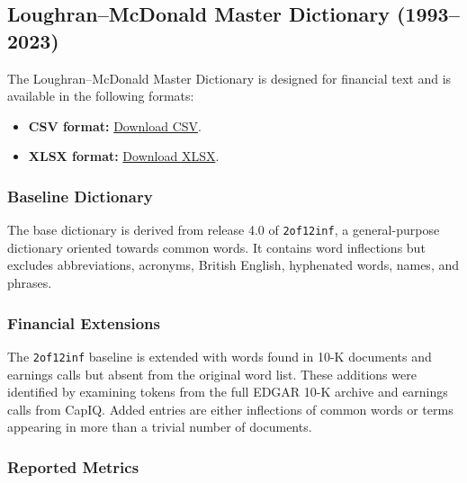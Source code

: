 \documentclass[12pt,openany]{book}
\theoremstyle{definition}
\theoremstyle{remark}
\begin{document}
\subsection{Loughran--McDonald Master Dictionary (1993--2023)}

The Loughran--McDonald Master Dictionary is designed for financial text and
is available in the following formats:

\begin{itemize}





\item \textbf{CSV format:}
\href{https://drive.google.com/file/d/1ptUgGVeeUGhCbaKL14Ri3Xi5xOKkPkUD/view?usp=sharing}{Download CSV}.



\item \textbf{XLSX format:}
\href{https://docs.google.com/spreadsheets/d/1qI1goptbRMlJMKXQFctE4T2wU73m1ikR/edit?usp=sharing\&ouid=116301805707217204647\&rtpof=true\&sd=true}{Download XLSX}.
\end{itemize}



\subsubsection{Baseline Dictionary}

The base dictionary is derived from release 4.0 of \texttt{2of12inf}, a
general-purpose dictionary oriented towards common words. It contains word
inflections but excludes abbreviations, acronyms, British English,
hyphenated words, names, and phrases.



\subsubsection{Financial Extensions}

The \texttt{2of12inf} baseline is extended with words found in 10-K documents
and earnings calls but absent from the original word list. These additions
were identified by examining tokens from the full EDGAR 10-K archive and
earnings calls from CapIQ. Added entries are either inflections of common
words or terms appearing in more than a trivial number of documents.



\subsubsection{Reported Metrics}
\end{document}
